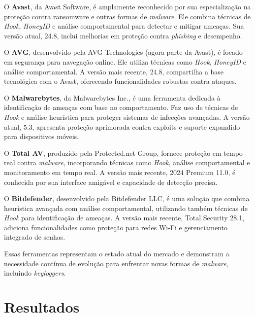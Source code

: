 \documentclass[12pt]{article}
\begin{document}
O \textbf{Avast}, da Avast Software, é amplamente reconhecido por sua especialização na proteção contra ransomware e outras formas de \textit{malware}. Ele combina técnicas de \textit{Hook}, \textit{HoneyID} e análise comportamental para detectar e mitigar ameaças. Sua versão atual, 24.8, inclui melhorias em proteção contra \textit{phishing} e desempenho.

O \textbf{AVG}, desenvolvido pela AVG Technologies (agora parte da Avast), é focado em segurança para navegação online. Ele utiliza técnicas como \textit{Hook}, \textit{HoneyID} e análise comportamental. A versão mais recente, 24.8, compartilha a base tecnológica com o Avast, oferecendo funcionalidades robustas contra ataques.

O \textbf{Malwarebytes}, da Malwarebytes Inc., é uma ferramenta dedicada à identificação de ameaças com base no comportamento. Faz uso de técnicas de \textit{Hook} e análise heurística para proteger sistemas de infecções avançadas. A versão atual, 5.3, apresenta proteção aprimorada contra exploits e suporte expandido para dispositivos móveis.

O \textbf{Total AV}, produzido pela Protected.net Group, fornece proteção em tempo real contra \textit{malware}, incorporando técnicas como \textit{Hook}, análise comportamental e monitoramento em tempo real. A versão mais recente, 2024 Premium 11.0, é conhecida por sua interface amigável e capacidade de detecção precisa.

O \textbf{Bitdefender}, desenvolvido pela Bitdefender LLC, é uma solução que combina heurística avançada com análise comportamental, utilizando também técnicas de \textit{Hook} para identificação de ameaças. A versão mais recente, Total Security 28.1, adiciona funcionalidades como proteção para redes Wi-Fi e gerenciamento integrado de senhas.

Essas ferramentas representam o estado atual do mercado e demonstram a necessidade contínua de evolução para enfrentar novas formas de \textit{malware}, incluindo \textit{keyloggers}.


\section{Resultados}
\end{document}
